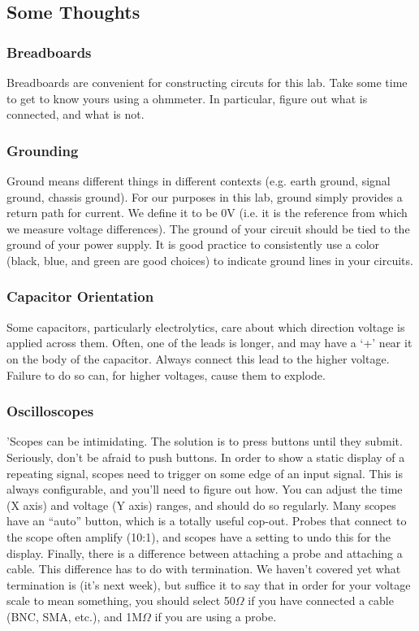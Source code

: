 \documentclass[11pt]{article}
\begin{document}
\subsection*{Some Thoughts}

\subsubsection*{Breadboards}

Breadboards are convenient for constructing circuts for this lab.  Take some time to get to know yours
using a ohmmeter.  In particular, figure out what is connected, and what is not.

\subsubsection*{Grounding}

Ground means different things in different contexts (e.g. earth ground, signal ground,
chassis ground).  For our purposes in
this lab, ground simply provides a return path for current.  We define it to be
0V (i.e. it is the reference from which we measure voltage differences).  The
ground of your circuit should be tied to the ground of your power supply.  It
is good practice to consistently use a color (black, blue, and green are good
choices) to indicate ground lines in your circuits.

\subsubsection*{Capacitor Orientation}

Some capacitors, particularly electrolytics, care about which direction voltage
is applied across them.  Often, one of the leads is longer, and may have a `+'
near it on the body of the capacitor.  Always connect this lead to the higher voltage.
Failure to do so can, for higher voltages, cause them to explode.

\subsubsection*{Oscilloscopes}

'Scopes can be intimidating.  The solution is to press buttons until they submit.  Seriously, don't be afraid
to push buttons.  In order to show a static display of a repeating signal, scopes need to trigger on
some edge of an input signal.  This is always configurable, and you'll need to figure out how.  You can
adjust the time (X axis) and voltage (Y axis) ranges, and should do so regularly.  Many scopes have an ``auto''
button, which is a totally useful cop-out.  Probes that connect to the scope often amplify
(10:1), and scopes have a setting to undo this for the display.  Finally, there is a difference between
attaching a probe and attaching a cable.  This difference has to do with termination.  We haven't covered yet
what termination is (it's next week), but suffice it to say that in order for your voltage scale to mean
something, you should select 50$\Omega$ if you have connected a cable (BNC, SMA, etc.), and 1M$\Omega$ if
you are using a probe.
\end{document}
